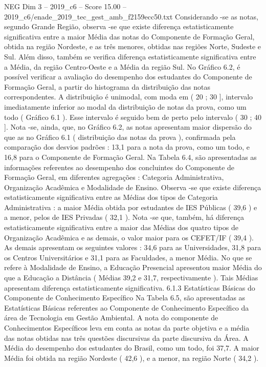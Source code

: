 \begin{textsample}{NEG Dim 3 – 2019\_c6 – Score 15.00 – 2019\_c6/enade\_2019\_tec\_gest\_amb\_f2159ecc50.txt}
Considerando -se as notas, segundo Grande Região, observa -se que existe diferença estatisticamente significativa entre a maior Média das notas do Componente de Formação Geral, obtida na região Nordeste, e as três menores, obtidas nas regiões Norte, Sudeste e Sul.
Além disso, também se verifica diferença estatisticamente significativa entre a Média, da região Centro-Oeste e a Média da região Sul.
No Gráfico 6.2, é possível verificar a avaliação do desempenho dos estudantes do Componente de Formação Geral, a partir do histograma da distribuição das notas correspondentes.
A distribuição é unimodal, com moda em ( 20 ; 30 ], intervalo imediatamente inferior ao modal da distribuição de notas da prova, como um todo ( Gráfico 6.1 ).
Esse intervalo é seguido bem de perto pelo intervalo ( 30 ; 40 ].
Nota -se, ainda, que, no Gráfico 6.2, as notas apresentam maior dispersão do que as no Gráfico 6.1 ( distribuição das notas da prova ), confirmada pela comparação dos desvios padrões : 13,1 para a nota da prova, como um todo, e 16,8 para o Componente de Formação Geral.
Na Tabela 6.4, são apresentadas as informações referentes ao desempenho dos concluintes do Componente de Formação Geral, em diferentes agregações : Categoria Administrativa, Organização Acadêmica e Modalidade de Ensino.
Observa -se que existe diferença estatisticamente significativa entre as Médias dos tipos de Categoria Administrativa : a maior Média obtida por estudantes de IES Públicas ( 39,6 ) e a menor, pelos de IES Privadas ( 32,1 ).
Nota -se que, também, há diferença estatisticamente significativa entre a maior das Médias dos quatro tipos de Organização Acadêmica e as demais, o valor maior para os CEFET/IF ( 39,4 ).
As demais apresentam os seguintes valores : 34,6 para as Universidades, 31,8 para os Centros Universitários e 31,1 para as Faculdades, a menor Média.
No que se refere à Modalidade de Ensino, a Educação Presencial apresentou maior Média do que a Educação a Distância ( Médias 39,2 e 31,7, respectivamente ).
Tais Médias apresentam diferença estatisticamente significativa. 6.1.3 Estatísticas Básicas do Componente de Conhecimento Específico Na Tabela 6.5, são apresentadas as Estatísticas Básicas referentes ao Componente de Conhecimento Específico da área de Tecnologia em Gestão Ambiental.
A nota do componente de Conhecimentos Específicos leva em conta as notas da parte objetiva e a média das notas obtidas nas três questões discursivas da parte discursiva da Área.
A Média do desempenho dos estudantes do Brasil, como um todo, foi 37,7.
A maior Média foi obtida na região Nordeste ( 42,6 ), e a menor, na região Norte ( 34,2 ).

\end{textsample}
